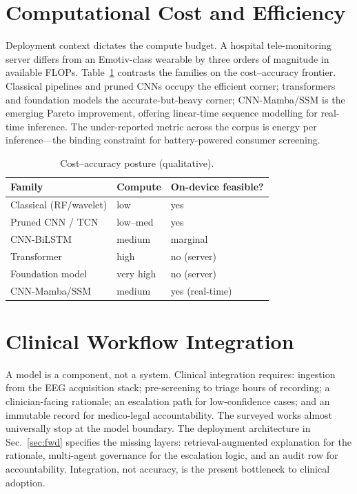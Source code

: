 \section{Computational Cost and Efficiency}
Deployment context dictates the compute budget. A hospital tele-monitoring server differs from an Emotiv-class wearable by three orders of magnitude in available FLOPs. Table~\ref{tab:cost} contrasts the families on the cost--accuracy frontier. Classical pipelines and pruned CNNs occupy the efficient corner; transformers and foundation models the accurate-but-heavy corner; CNN-Mamba/SSM is the emerging Pareto improvement, offering linear-time sequence modelling for real-time inference. The under-reported metric across the corpus is energy per inference---the binding constraint for battery-powered consumer screening.
\begin{table}[h]\centering\caption{Cost--accuracy posture (qualitative).}\label{tab:cost}
\footnotesize\begin{tabular}{lll}\toprule
Family & Compute & On-device feasible?\\\midrule
Classical (RF/wavelet) & low & yes\\
Pruned CNN / TCN & low--med & yes\\
CNN-BiLSTM & medium & marginal\\
Transformer & high & no (server)\\
Foundation model & very high & no (server)\\
CNN-Mamba/SSM & medium & yes (real-time)\\\bottomrule
\end{tabular}\end{table}

\section{Clinical Workflow Integration}
A model is a component, not a system. Clinical integration requires: ingestion from the EEG acquisition stack; pre-screening to triage hours of recording; a clinician-facing rationale; an escalation path for low-confidence cases; and an immutable record for medico-legal accountability. The surveyed works almost universally stop at the model boundary. The deployment architecture in Sec.~\ref{sec:fwd} specifies the missing layers: retrieval-augmented explanation for the rationale, multi-agent governance for the escalation logic, and an audit row for accountability. Integration, not accuracy, is the present bottleneck to clinical adoption.

